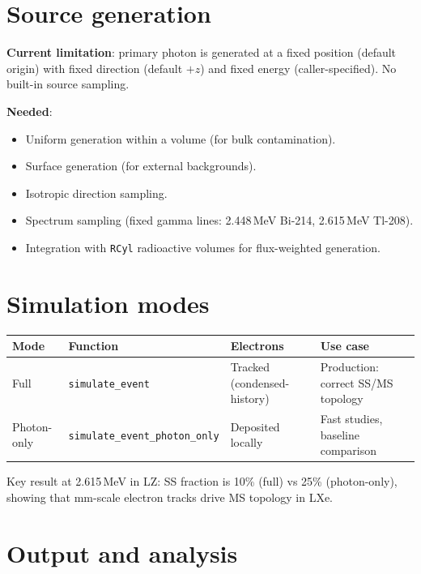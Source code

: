 \documentclass{article}
\begin{document}
\section{Source generation}

\textbf{Current limitation}: primary photon is generated at a fixed position (default origin) with fixed direction (default $+z$) and fixed energy (caller-specified). No built-in source sampling.

\textbf{Needed}:
\begin{itemize}
  \item Uniform generation within a volume (for bulk contamination).
  \item Surface generation (for external backgrounds).
  \item Isotropic direction sampling.
  \item Spectrum sampling (fixed gamma lines: 2.448\,MeV Bi-214, 2.615\,MeV Tl-208).
  \item Integration with \texttt{RCyl} radioactive volumes for flux-weighted generation.
\end{itemize}

\section{Simulation modes}

\begin{table}[h]
\centering
\begin{tabular}{@{}llll@{}}
\toprule
Mode & Function & Electrons & Use case \\
\midrule
Full        & \texttt{simulate\_event}              & Tracked (condensed-history) & Production: correct SS/MS topology \\
Photon-only & \texttt{simulate\_event\_photon\_only} & Deposited locally           & Fast studies, baseline comparison \\
\bottomrule
\end{tabular}
\end{table}

Key result at 2.615\,MeV in LZ: SS fraction is 10\% (full) vs 25\% (photon-only), showing that mm-scale electron tracks drive MS topology in LXe.

\section{Output and analysis}
\end{document}
